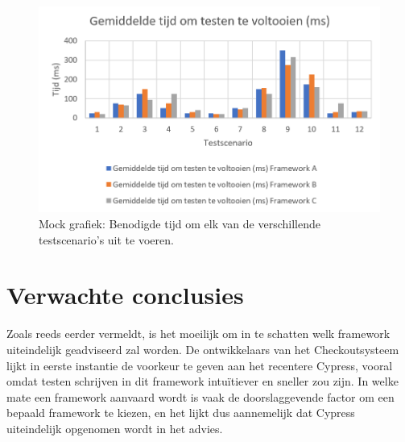     \begin{figure}[h!]
    \includegraphics[width=\linewidth]{img/gemtijdtestenvoltooien.PNG}
    \caption{Mock grafiek: Benodigde tijd om elk van de verschillende testscenario's uit te voeren.}
    \label{fig:uitvoertijdmock}
    \end{figure}


\section{Verwachte conclusies}
\label{sec:verwachte_conclusies}

Zoals reeds eerder vermeldt, is het moeilijk om in te schatten welk framework uiteindelijk geadviseerd zal worden. De ontwikkelaars van het Checkoutsysteem lijkt in eerste instantie de voorkeur te geven aan het recentere Cypress, vooral omdat testen schrijven in dit framework intuïtiever en sneller zou zijn. In welke mate een framework aanvaard wordt is vaak de doorslaggevende factor om een bepaald framework te kiezen, en het lijkt dus aannemelijk dat Cypress uiteindelijk opgenomen wordt in het advies.


